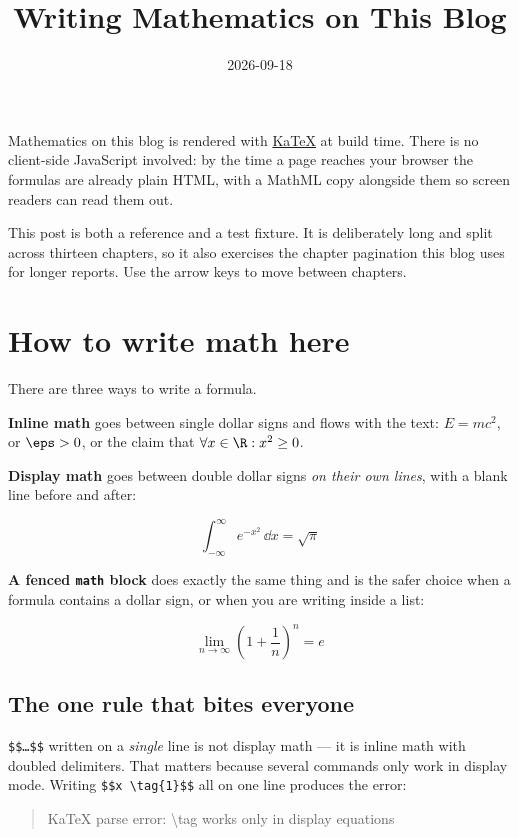 \title{Writing Mathematics on This Blog}
\date{2026-09-18}



Mathematics on this blog is rendered with \href{https://katex.org}{KaTeX} at build time. There is no client-side JavaScript involved: by the time a page reaches your browser the formulas are already plain HTML, with a MathML copy alongside them so screen readers can read them out.

This post is both a reference and a test fixture. It is deliberately long and split across thirteen chapters, so it also exercises the chapter pagination this blog uses for longer reports. Use the arrow keys to move between chapters.

\section{How to write math here}

There are three ways to write a formula.

\textbf{Inline math} goes between single dollar signs and flows with the text: $E = mc^2$, or $\eps > 0$, or the claim that $\forall x \in \R : x^2 \ge 0$.

\textbf{Display math} goes between double dollar signs \emph{on their own lines}, with a blank line before and after:

\[
\int_{-\infty}^{\infty} e^{-x^2}\,\dd x = \sqrt{\pi}
\]

\textbf{A fenced \texttt{math} block} does exactly the same thing and is the safer choice when a formula contains a dollar sign, or when you are writing inside a list:

\[
\lim_{n \to \infty} \left(1 + \frac{1}{n}\right)^n = e
\]

\subsection{The one rule that bites everyone}

\texttt{\$\$…\$\$} written on a \emph{single} line is not display math — it is inline math with doubled delimiters. That matters because several commands only work in display mode. Writing \texttt{\$\$x \textbackslash{}tag\{1\}\$\$} all on one line produces the error:

\begin{quote}
KaTeX parse error: \textbackslash{}tag works only in display equations
\end{quote}

